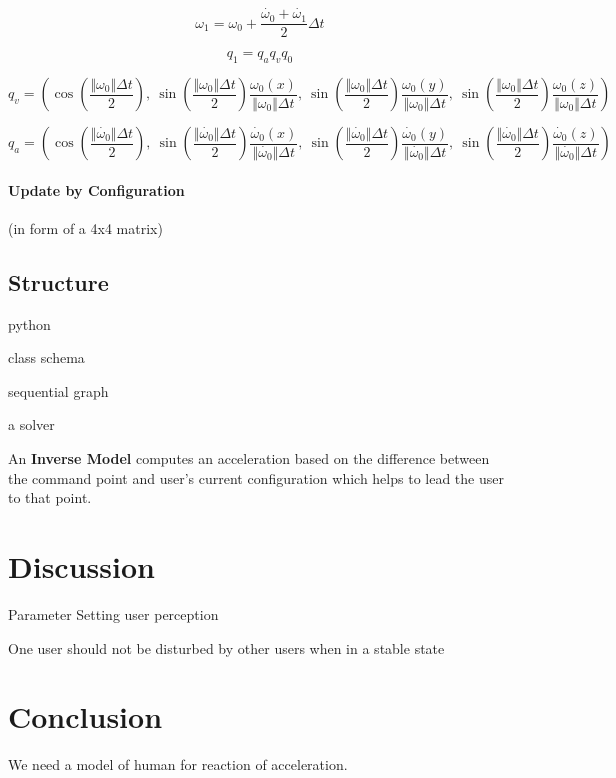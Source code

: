 \[
\omega_{1}=\omega_{0}+\frac{\dot{\omega_{0}}+\dot{\omega_{1}}}{2}\Delta t
\]

\[
q_{1}=q_{a}q_{v}q_{0}
\]

\[
q_{v}=\left(\cos(\frac{\Vert\omega_{0}\Vert\Delta t}{2}),\:\sin(\frac{\Vert\omega_{0}\Vert\Delta t}{2})\frac{\omega_{0}(x)}{\Vert\omega_{0}\Vert\Delta t},\:\sin(\frac{\Vert\omega_{0}\Vert\Delta t}{2})\frac{\omega_{0}(y)}{\Vert\omega_{0}\Vert\Delta t},\:\sin(\frac{\Vert\omega_{0}\Vert\Delta t}{2})\frac{\omega_{0}(z)}{\Vert\omega_{0}\Vert\Delta t}\right)
\]

\[
q_{a}=\left(\cos(\frac{\Vert\dot{\omega_{0}}\Vert\Delta t}{2}),\:\sin(\frac{\Vert\dot{\omega_{0}}\Vert\Delta t}{2})\frac{\dot{\omega_{0}}(x)}{\Vert\dot{\omega_{0}}\Vert\Delta t},\:\sin(\frac{\Vert\dot{\omega_{0}}\Vert\Delta t}{2})\frac{\dot{\omega_{0}}(y)}{\Vert\dot{\omega_{0}}\Vert\Delta t},\:\sin(\frac{\Vert\dot{\omega_{0}}\Vert\Delta t}{2})\frac{\dot{\omega_{0}}(z)}{\Vert\dot{\omega_{0}}\Vert\Delta t}\right)
\]


\paragraph{Update by Configuration}
(in form of a 4x4 matrix)



\subsection{Structure}

python

class schema

sequential graph

a solver

An \textbf{Inverse Model} computes an acceleration based on the difference between the command point and user's current configuration which helps to lead the user to that point.




\section{Discussion}
Parameter Setting user perception

One user should not be disturbed by other users when in a stable state


\section{Conclusion}
We need a model of human for reaction of acceleration.